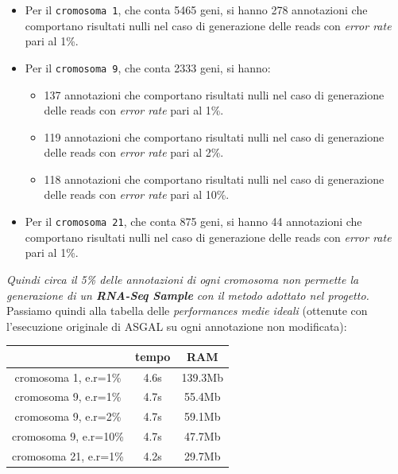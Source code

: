 \documentclass[a4paper,12pt, oneside]{book}
\begin{document}
\begin{itemize}
  \item Per il \texttt{cromosoma 1}, che conta 5465 geni, si hanno 278
  annotazioni che comportano risultati nulli nel caso di generazione
  delle reads con \textit{error rate} pari al 1\%.
  \item Per il \texttt{cromosoma 9}, che conta 2333 geni, si hanno:
  \begin{itemize}
    \item 137 annotazioni che comportano risultati nulli nel caso di generazione
    delle reads con \textit{error rate} pari al 1\%.
    \item 119 annotazioni che comportano risultati nulli nel caso di generazione
    delle reads con \textit{error rate} pari al 2\%.
    \item 118 annotazioni che comportano risultati nulli nel caso di generazione
    delle reads con \textit{error rate} pari al 10\%.
  \end{itemize} 
  \item Per il \texttt{cromosoma 21}, che conta 875 geni, si hanno 44
  annotazioni che comportano risultati nulli nel caso di generazione
  delle reads con \textit{error rate} pari al 1\%.
\end{itemize}
\textit{Quindi circa il 5\% delle annotazioni di ogni cromosoma non permette la
  generazione di un \textbf{RNA-Seq Sample} con il metodo adottato nel
  progetto.}
\\  
Passiamo quindi alla tabella delle \textit{performances medie ideali} (ottenute
con l'esecuzione originale di ASGAL su ogni annotazione non modificata):
\begin{center}

  \begin{tabular}{c|c|c}
    \hline
    \cellcolor[gray]{0.6}& \cellcolor[gray]{0.8}tempo & \cellcolor[gray]{0.8}RAM\\

    \hline
    cromosoma 1, e.r=1\% & 4.6s & 139.3Mb\\
    \hline
    cromosoma 9, e.r=1\% & 4.7s & 55.4Mb\\
    \hline
    cromosoma 9, e.r=2\% & 4.7s & 59.1Mb\\
    \hline
    cromosoma 9, e.r=10\% & 4.7s & 47.7Mb\\
    \hline
    cromosoma 21, e.r=1\% & 4.2s & 29.7Mb\\
    \hline
  \end{tabular}
\end{center}
\end{document}

